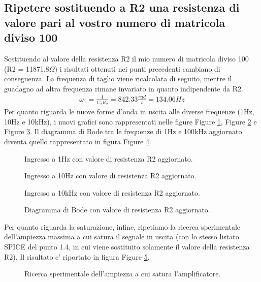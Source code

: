 \documentclass[a4paper,10pt]{article}
\begin{document}
\subsection{Ripetere sostituendo a R2 una resistenza di valore pari al vostro numero di matricola diviso 100}
Sostituendo al valore della resistenza R2 il mio numero di matricola diviso 100 (R2 = 11871.8$\Omega$) i risultati ottenuti nei punti precedenti cambiano di conseguenza. La frequenza di taglio viene ricalcolata di seguito, mentre il guadagno ad altra frequenza rimane invariato in quanto indipendente da R2.
\begin{align*}
\omega_1 = \frac{1}{C_2R_2} = 842.33 \frac{rad}{s} = 134.06Hz
\end{align*}
Per quanto riguarda le nuove forme d'onda in uscita alle diverse frequenze (1Hz, 10Hz e 10kHz), i nuovi grafici sono rappresentati nelle figure Figure \ref{fig:plot1hzr2}, Figure \ref{fig:plot10hzr2} e Figure \ref{fig:plot10khzr2}. Il diagramma di Bode tra le frequenze di 1Hz e 100kHz aggiornato diventa quello rappresentato in figura Figure \ref{fig:plotboder2}.
\begin{figure}[h!]
	\centering
  	\caption{Ingresso a 1Hz con valore di resistenza R2 aggiornato.}
  	\label{fig:plot1hzr2}
\end{figure}

\begin{figure}[h!]
	\centering
  	\caption{Ingresso a 10Hz con valore di resistenza R2 aggiornato.}
  	\label{fig:plot10hzr2}
\end{figure}

\begin{figure}[h!]
	\centering
  	\caption{Ingresso a 10kHz con valore di resistenza R2 aggiornato.}
  	\label{fig:plot10khzr2}
\end{figure}

\begin{figure}[h!]
	\centering
  	\caption{Diagramma di Bode con valore di resistenza R2 aggiornato.}
  	\label{fig:plotboder2}
\end{figure}

\pagebreak
Per quanto riguarda la saturazione, infine, ripetiamo la ricerca sperimentale dell'ampiezza massima a cui satura il segnale in uscita (con lo stesso listato SPICE del punto 1.4, in cui viene sostituito solamente il valore della resistenza R2). Il risultato e' riportato in figura Figure \ref{fig:plotsatr2}.

\begin{figure}[h!]
	\centering
  	\caption{Ricerca sperimentale dell'ampiezza a cui satura l'amplificatore.}
  	\label{fig:plotsatr2}
\end{figure}
\end{document}
